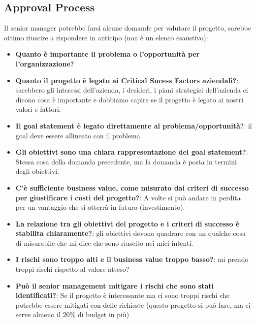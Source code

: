 \subsection{Approval Process}
Il senior manager potrebbe farsi alcune domande per valutare il progetto, sarebbe ottimo riuscire a rispondere in anticipo (non è un elenco esaustivo):
\begin{itemize}
	\item \textbf{Quanto è importante il problema o l'opportunità per l'organizzazione?}
	\item \textbf{Quanto il progetto è legato ai Critical Sucess Factors aziendali?}: sarebbero gli interessi dell'azienda, i desideri, i piani strategici dell'azienda ci dicono cosa è importante e dobbiamo capire se il progetto è legato ai nostri valori e fattori.
	\item \textbf{Il goal statement è legato direttamente al problema/opportunità?}: il goal deve essere allineato con il problema.
	\item \textbf{Gli obiettivi sono una chiara rappresentazione del goal statement?}: Stessa cosa della domanda precedente, ma la domanda è posta in termini degli obiettivi.
	\item \textbf{C'è sufficiente business value, come misurato dai criteri di successo per giustificare i costi del progetto?}: A volte si può andare in perdita per un vantaggio che si otterrà in futuro (investimento).
	\item \textbf{La relazione tra gli obiettivi del progetto e i criteri di successo è stabilita chiaramente?}: gli obiettivi devono quadrare con un qualche cosa di misurabile che mi dice che sono riuscito nei miei intenti.
	\item \textbf{I rischi sono troppo alti e il business value troppo basso?}: mi prendo troppi rischi rispetto al valore atteso?
	\item \textbf{Può il senior management mitigare i rischi che sono stati identificati?}: Se il progetto è interessante ma ci sono troppi rischi che potrebbe essere mitigati con delle richieste (questo progetto si può fare, ma ci serve almeno il 20\% di budget in più)
\end{itemize}
\newpage

